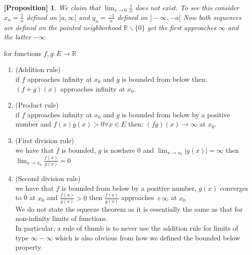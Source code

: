 \documentclass[titlepage]{article}
\newtheorem{prop}{[Proposition]}
\numberwithin{equation}{subsection}
\begin{document}
\begin{prop}
We claim that $\lim_{x \to 0} \frac{1}{x}$ does not exist. To see this consider $x_{n} = \frac{1}{n}$ defined on $]a,\infty[$ and $y_{n} = \frac{-1}{n}$ defined on $]- \infty, -a[$ Now both sequences are defined on the pointed neighborhood $\mathbb{R}\backslash \{0\}$ yet the first approaches $\infty$ and the latter $- \infty$  
\end{prop}

\begin{tcolorbox}[drop shadow, title = (Limit of functions algebra),lower separated=true]

for functions $f,g: E \to \mathbb{R}$
\begin{enumerate}
    \item (Addition rule)
    \\
    if $f$ approaches infinity at $x_{0}$ and $g$ is bounded from below then: $(f+g)(x)$ approaches infinity at $x_{0}$. 
      \item (Product rule)
    \\
    if $f$ approaches infinity at $x_{0}$ and $g$ is bounded from below by a positive number and $f(x)g(x) > 0 \forall x \in E$ then: $(fg)(x) \to \infty$ at $x_{0}$. 
    \\
    
    \item (First division rule)
    \\
    we have that $f$ is bounded, $g$ is nowhere 0 and $\lim_{x \to x_{0}}|g(x)| = \infty$ then $\lim_{x \to x_{0}} \frac{f(x)}{g(x)} = 0$
    \\
    
    \item (Second division rule)
    \\
    we have that $f$ is bounded from below by a positive number, $g(x)$ converges to 0 at $x_{0}$ and $\frac{f(x)}{g(x)} > 0$ then $\frac{f(x)}{g(x)}$ approaches $+\infty$ at $x_{0}$
    \\
    
    We do not state the squeeze theorem as it is essentially the same as that for non-infinity limits of functions. 
    \\
    
    In particular, a rule of thumb is to never use the addition rule for limits of type $ \infty - \infty$ which is also obvious from how we defined the bounded below property. 
\end{enumerate}
\\
\end{tcolorbox}
\end{document}

